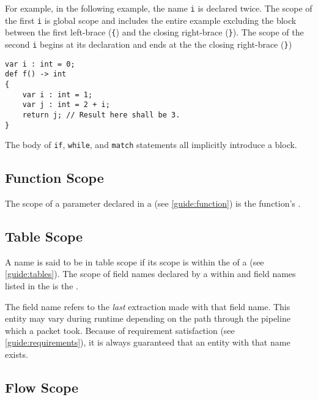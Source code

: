 For example, in the following example, the name \texttt{i} is declared twice. The scope of the first \texttt{i} is global scope and includes the entire example excluding the block between the first left-brace (\texttt{\{}) and the closing right-brace (\texttt{\}}). The scope of the second \texttt{i} begins at its declaration and ends at the the closing right-brace (\texttt{\}})

\begin{minip}
\begin{lstlisting}
var i : int = 0;
def f() -> int
{
	var i : int = 1;
	var j : int = 2 + i;
	return j; // Result here shall be 3.
}
\end{lstlisting}
\end{minip}

The body of \texttt{if}, \texttt{while}, and \texttt{match} statements all implicitly introduce a block.

\subsection{Function Scope} \label{guide:function_scope}

The scope of a parameter declared in a  (see \ref{guide:function}) is the function's .

\subsection{Table Scope} \label{guide:table_scope}

A name is said to be in table scope if its scope is within the  of a  (see \ref{guide:tables}). The scope of field names declared by a  within  and field names listed in the  is the .

The field name refers to the \textit{last} extraction made with that field name. This entity may vary during runtime depending on the path through the pipeline which a packet took. Because of requirement satisfaction (see \ref{guide:requirements}), it is always guaranteed that an entity with that name exists.

\subsection{Flow Scope} \label{guide:flow_scope}

